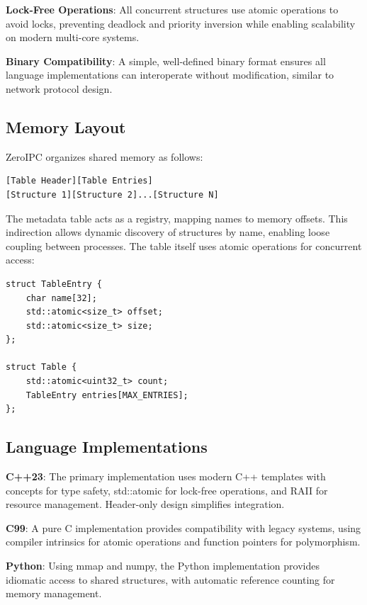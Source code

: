 \documentclass[10pt,conference]{IEEEtran}
\begin{document}
\textbf{Lock-Free Operations}: All concurrent structures use atomic operations to avoid locks, preventing deadlock and priority inversion while enabling scalability on modern multi-core systems.

\textbf{Binary Compatibility}: A simple, well-defined binary format ensures all language implementations can interoperate without modification, similar to network protocol design.

\subsection{Memory Layout}

ZeroIPC organizes shared memory as follows:

\begin{lstlisting}[caption={Memory Layout Structure},label={lst:layout}]
[Table Header][Table Entries]
[Structure 1][Structure 2]...[Structure N]
\end{lstlisting}

The metadata table acts as a registry, mapping names to memory offsets. This indirection allows dynamic discovery of structures by name, enabling loose coupling between processes. The table itself uses atomic operations for concurrent access:

\begin{lstlisting}[caption={Metadata Table Structure},label={lst:table}]
struct TableEntry {
    char name[32];
    std::atomic<size_t> offset;
    std::atomic<size_t> size;
};

struct Table {
    std::atomic<uint32_t> count;
    TableEntry entries[MAX_ENTRIES];
};
\end{lstlisting}

\subsection{Language Implementations}

\textbf{C++23}: The primary implementation uses modern C++ templates with concepts for type safety, std::atomic for lock-free operations, and RAII for resource management. Header-only design simplifies integration.

\textbf{C99}: A pure C implementation provides compatibility with legacy systems, using compiler intrinsics for atomic operations and function pointers for polymorphism.

\textbf{Python}: Using mmap and numpy, the Python implementation provides idiomatic access to shared structures, with automatic reference counting for memory management.
\end{document}
